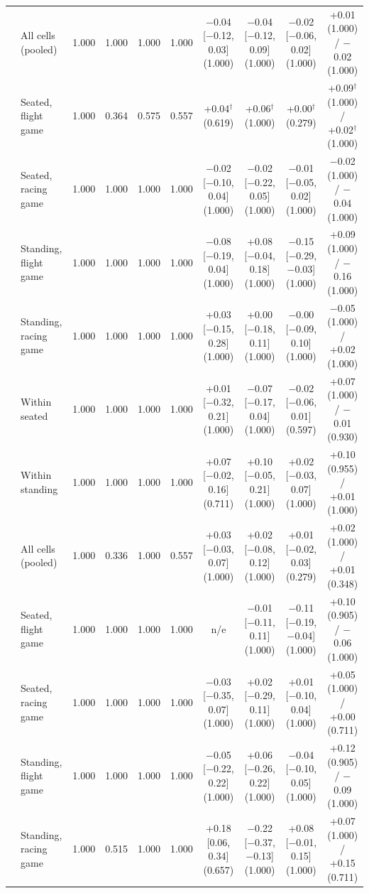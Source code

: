 \begin{table}[ht]
\begin{tabular}{@{}llcccccccc@{}}
 & All cells (pooled) & 1.000 & 1.000 & 1.000 & 1.000 & $-$0.04 [$-$0.12, 0.03] (1.000) & $-$0.04 [$-$0.12, 0.09] (1.000) & $-$0.02 [$-$0.06, 0.02] (1.000) & +0.01 (1.000) / $-$0.02 (1.000) \\
 & Seated, flight game & 1.000 & 0.364 & 0.575 & 0.557 & +0.04$^\dagger$ (0.619) & +0.06$^\dagger$ (1.000) & +0.00$^\dagger$ (0.279) & +0.09$^\dagger$ (1.000) / +0.02$^\dagger$ (1.000) \\
 & Seated, racing game & 1.000 & 1.000 & 1.000 & 1.000 & $-$0.02 [$-$0.10, 0.04] (1.000) & $-$0.02 [$-$0.22, 0.05] (1.000) & $-$0.01 [$-$0.05, 0.02] (1.000) & $-$0.02 (1.000) / $-$0.04 (1.000) \\
 & Standing, flight game & 1.000 & 1.000 & 1.000 & 1.000 & $-$0.08 [$-$0.19, 0.04] (1.000) & +0.08 [$-$0.04, 0.18] (1.000) & $-$0.15 [$-$0.29, $-$0.03] (1.000) & +0.09 (1.000) / $-$0.16 (1.000) \\
 & Standing, racing game & 1.000 & 1.000 & 1.000 & 1.000 & +0.03 [$-$0.15, 0.28] (1.000) & +0.00 [$-$0.18, 0.11] (1.000) & $-$0.00 [$-$0.09, 0.10] (1.000) & $-$0.05 (1.000) / +0.02 (1.000) \\
\midrule
\sevone{} & Within seated & 1.000 & 1.000 & 1.000 & 1.000 & +0.01 [$-$0.32, 0.21] (1.000) & $-$0.07 [$-$0.17, 0.04] (1.000) & $-$0.02 [$-$0.06, 0.01] (0.597) & +0.07 (1.000) / $-$0.01 (0.930) \\
 & Within standing & 1.000 & 1.000 & 1.000 & 1.000 & +0.07 [$-$0.02, 0.16] (0.711) & +0.10 [$-$0.05, 0.21] (1.000) & +0.02 [$-$0.03, 0.07] (1.000) & +0.10 (0.955) / +0.01 (1.000) \\
 & All cells (pooled) & 1.000 & 0.336 & 1.000 & 0.557 & +0.03 [$-$0.03, 0.07] (1.000) & +0.02 [$-$0.08, 0.12] (1.000) & +0.01 [$-$0.02, 0.03] (0.279) & +0.02 (1.000) / +0.01 (0.348) \\
 & Seated, flight game & 1.000 & 1.000 & 1.000 & 1.000 & n/e & $-$0.01 [$-$0.11, 0.11] (1.000) & $-$0.11 [$-$0.19, $-$0.04] (1.000) & +0.10 (0.905) / $-$0.06 (1.000) \\
 & Seated, racing game & 1.000 & 1.000 & 1.000 & 1.000 & $-$0.03 [$-$0.35, 0.07] (1.000) & +0.02 [$-$0.29, 0.11] (1.000) & +0.01 [$-$0.10, 0.04] (1.000) & +0.05 (1.000) / +0.00 (0.711) \\
 & Standing, flight game & 1.000 & 1.000 & 1.000 & 1.000 & $-$0.05 [$-$0.22, 0.22] (1.000) & +0.06 [$-$0.26, 0.22] (1.000) & $-$0.04 [$-$0.10, 0.05] (1.000) & +0.12 (0.905) / $-$0.09 (1.000) \\
 & Standing, racing game & 1.000 & 0.515 & 1.000 & 1.000 & +0.18 [0.06, 0.34] (0.657) & $-$0.22 [$-$0.37, $-$0.13] (1.000) & +0.08 [$-$0.01, 0.15] (1.000) & +0.07 (1.000) / +0.15 (0.711) \\
\bottomrule
\end{tabular}
\end{table}